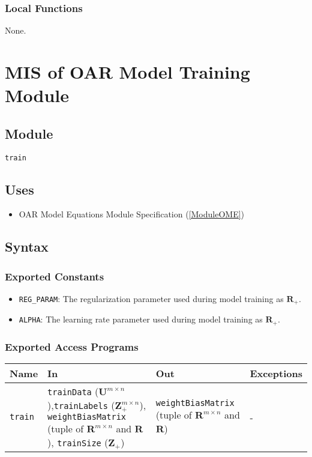 \documentclass[12pt, titlepage]{article}
\def\code#1{\texttt{#1}}
\begin{document}
\subsubsection{Local Functions}

None.

\section{MIS of OAR Model Training Module} \label{ModuleOMTr} 

\subsection{Module}

\code{train}

\subsection{Uses}

\begin{itemize}
  \item OAR Model Equations Module Specification (\ref{ModuleOME})
\end{itemize}

\subsection{Syntax}

\subsubsection{Exported Constants}

\begin{itemize}
  \item \code{REG\_PARAM}: The regularization parameter used during model training as $\mathbf{R}_{+}$.
  \item \code{ALPHA}: The learning rate parameter used during model training as $\mathbf{R}_{+}$.
\end{itemize}

\subsubsection{Exported Access Programs}

\begin{center}
\begin{tabular}{p{2cm} p{4cm} p{4cm} p{2cm}}
\hline
\textbf{Name} & \textbf{In} & \textbf{Out} & \textbf{Exceptions} \\
\hline
\code{train} & \code{trainData} ($\mathbf{U}^{m \times n}$),\code{trainLabels} ($\mathbf{Z}_{+}^{m \times n}$), \code{weightBiasMatrix} (tuple of $\mathbf{R}^{m \times n}$ and $\mathbf{R}$), \code{trainSize} ($\mathbf{Z}_{+}$)& \code{weightBiasMatrix} (tuple of $\mathbf{R}^{m \times n}$ and $\mathbf{R}$) & - \\
\hline
\end{tabular}
\end{center}
\end{document}
